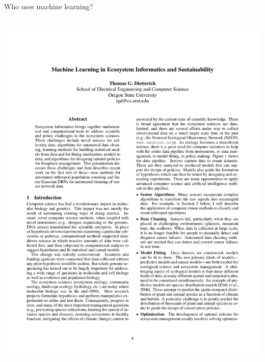\documentclass[pdf]{beamer}
\begin{document}
\begin{frame}{Who uses machine learning?}
\begin{columns}
\begin{center}
	\includegraphics[width=\textwidth]{useML01.pdf}\\
	\vspace{2cm}

\end{center}
\end{columns}
\end{frame}
\end{document}
